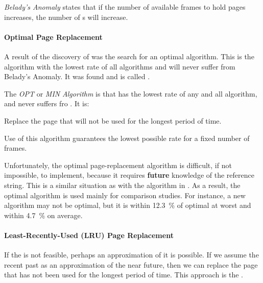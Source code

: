 \begin{definition}\label{def:Beladys_Anomaly}
  \emph{Belady's Anomaly} states that if the number of available frames to hold pages increases, the number of s will increase.
\end{definition}

\paragraph{Optimal Page Replacement}\label{par:Optimal_Page_Replacement}
A result of the discovery of  was the search for an optimal  algorithm.
This is the algorithm with the lowest  rate of all algorithms and will never suffer from Belady's Anomaly.
It was found and is called .

\begin{definition}\label{def:Optimal_Page_Replacement_Algorithm}
  The \emph{OPT} or \emph{MIN}  \emph{Algorithm} is that has the lowest  rate of any and all algorithm, and never suffers fro .
  It is:
  \begin{center}
    Replace the page that will not be used for the longest period of time.
  \end{center}

  Use of this  algorithm guarantees the lowest possible  rate for a fixed number of frames.
\end{definition}

Unfortunately, the optimal page-replacement algorithm is difficult, if not impossible, to implement, because it requires \textbf{future} knowledge of the reference string.
This is a similar situation as with the  algorithm in .
As a result, the optimal algorithm is used mainly for comparison studies.
For instance, a new algorithm may not be optimal, but it is within \SI{12.3}{\percent} of optimal at worst and within \SI{4.7}{\percent} on average.

\paragraph{Least-Recently-Used (LRU) Page Replacement}\label{par:LRU_Page_Replacement}
If the  is not feasible, perhaps an approximation of it is possible.
If we assume the recent past as an approximation of the near future, then we can replace the page that has not been used for the longest period of time.
This approach is the .

